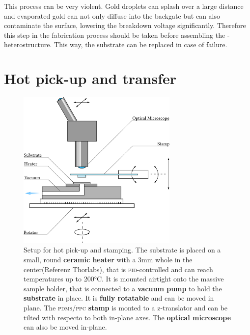 This process can be very violent. Gold droplets can splash over a large distance and evaporated gold can not only diffuse into the backgate but can also contaminate the \sio surface, lowering the breakdown voltage significantly. Therefore this step in the fabrication process should be taken before assembling the \tmd-\hbng heterostructure. This way, the substrate can be replaced in case of failure.

\section{Hot pick-up and transfer}\label{hot_pickup}

\begin{figure}
	\centering
	\includegraphics[width=0.7\textwidth]{Stempelaufbau.png}

	\caption{Setup for hot pick-up and stamping. The substrate is placed on a small, round \textbf{ceramic heater} with a 3mm whole in the center(Referenz Thorlabs), that is \textsc{pid}-controlled and can reach temperatures up to 200°C. It is mounted airtight onto the massive sample holder, that is connected to a \textbf{vacuum pump} to hold the \textbf{substrate} in place. It is \textbf{fully rotatable} and can be moved in plane. The \textsc{pdms/ppc} \textbf{stamp} is monted to a z-translator and can be tilted with respecto to both in-plane axes. The \textbf{optical microscope} can also be moved in-plane.}
	\label{stamping-setup}
\end{figure}


